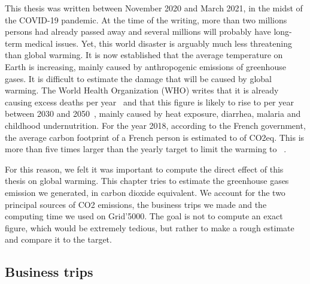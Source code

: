     This thesis was written between November 2020 and March 2021, in the midst of the COVID-19 pandemic. At the time
    of the writing, more than two millions persons had already passed away and several millions will probably have long-term
    medical issues. Yet, this world disaster is arguably much less threatening than global warming. It is now established
    that the average temperature on Earth is increasing, mainly caused by anthropogenic emissions of greenhouse gases.
    It is difficult to estimate the damage that will be caused by global warming. The World Health Organization (WHO)
    writes that it is already causing  excess deaths per year~\cite{who_globalwarming_current} and that this
    figure is likely to rise to  per year between 2030 and 2050~\cite{who_globalwarming_future}, mainly
    caused by heat exposure, diarrhea, malaria and childhood undernutrition.  For the year 2018, according to the
    French government, the average carbon footprint of a French person is estimated to  of CO2eq.  This
    is more than five times larger than the yearly  target to limit the warming to
    ~\cite{co2_gouv}.

    For this reason, we felt it was important to compute the direct effect of this thesis on global warming. This
    chapter tries to estimate the greenhouse gases emission we generated, in carbon dioxide equivalent. We account for
    the two principal sources of CO2 emissions, \ie the business trips we made and the computing time we used on
    Grid'5000.  The goal is not to compute an exact figure, which would be extremely tedious, but rather to make a rough
    estimate and compare it to the  target.

    \subsection*{Business trips}%

